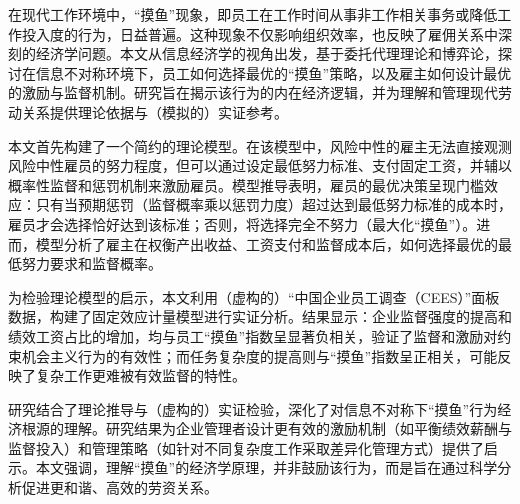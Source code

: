\begin{cabstract}
	在现代工作环境中，“摸鱼”现象，即员工在工作时间从事非工作相关事务或降低工作投入度的行为，日益普遍。这种现象不仅影响组织效率，也反映了雇佣关系中深刻的经济学问题。本文从{信息经济学}的视角出发，基于{委托代理理论}和{博弈论}，探讨在{信息不对称}环境下，员工如何选择最优的“{摸鱼}”策略，以及雇主如何设计最优的{激励}与{监督}机制。研究旨在揭示该行为的内在经济逻辑，并为理解和管理现代劳动关系提供理论依据与（模拟的）实证参考。

	本文首先构建了一个简约的理论模型。在该模型中，风险中性的雇主无法直接观测风险中性雇员的努力程度，但可以通过设定最低努力标准、支付固定工资，并辅以概率性{监督}和惩罚机制来激励雇员。模型推导表明，雇员的最优决策呈现门槛效应：只有当预期惩罚（监督概率乘以惩罚力度）超过达到最低努力标准的成本时，雇员才会选择恰好达到该标准；否则，将选择完全不努力（最大化“摸鱼”）。进而，模型分析了雇主在权衡产出收益、工资支付和监督成本后，如何选择最优的最低努力要求和监督概率。

	为检验理论模型的启示，本文利用（虚构的）“中国企业员工调查（CEES）”面板数据，构建了固定效应计量模型进行实证分析。结果显示：企业{监督}强度的提高和{绩效工资}占比的增加，均与员工“摸鱼”指数呈显著负相关，验证了{监督}和{激励}对约束机会主义行为的有效性；而任务复杂度的提高则与“摸鱼”指数呈正相关，可能反映了复杂工作更难被有效监督的特性。

	研究结合了理论推导与（虚构的）实证检验，深化了对{信息不对称}下“摸鱼”行为经济根源的理解。研究结果为企业管理者设计更有效的{激励}机制（如平衡绩效薪酬与监督投入）和管理策略（如针对不同复杂度工作采取差异化管理方式）提供了启示。本文强调，理解“摸鱼”的经济学原理，并非鼓励该行为，而是旨在通过科学分析促进更和谐、高效的劳资关系。
\end{cabstract}


